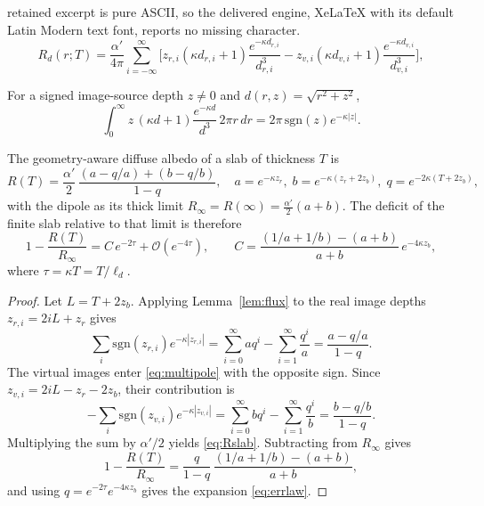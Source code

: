 \documentclass[10pt,a4paper]{amsart}
\newcommand{\ld}{\ell_d}
\begin{document}
retained excerpt is pure ASCII, so the delivered engine, XeLaTeX with its default Latin Modern text font, reports no missing character.
\begin{equation}
  R_d(r;T)=\frac{\alpha'}{4\pi}\sum_{i=-\infty}^{\infty}\!\Big[
  z_{r,i}(\kappa d_{r,i}{+}1)\frac{e^{-\kappa d_{r,i}}}{d_{r,i}^3}
  - z_{v,i}(\kappa d_{v,i}{+}1)\frac{e^{-\kappa d_{v,i}}}{d_{v,i}^3}\Big],
  \label{eq:multipole}
\end{equation}

\begin{lemma}
\label{lem:flux}
For a signed image-source depth $z\ne0$ and $d(r,z)=\sqrt{r^2+z^2}$,
\begin{equation}
\int_0^\infty z\,(\kappa d+1)\frac{e^{-\kappa d}}{d^3}\,2\pi r\,dr
=2\pi\,\mathrm{sgn}(z)e^{-\kappa |z|}.
\label{eq:fluxidentity}
\end{equation}
\end{lemma}

\begin{proposition}
\label{prop:law}
The geometry-aware diffuse albedo of a slab of thickness $T$ is
\begin{equation}
R(T)=\frac{\alpha'}{2}\,
\frac{(a-q/a)+(b-q/b)}{1-q},\quad
a=e^{-\kappa z_r},\; b=e^{-\kappa(z_r+2z_b)},\; q=e^{-2\kappa(T+2z_b)},
\label{eq:Rslab}
\end{equation}
with the dipole as its thick limit $R_\infty=R(\infty)=\tfrac{\alpha'}{2}(a+b)$. The
deficit of the finite slab relative to that limit is therefore
\begin{equation}
1-\frac{R(T)}{R_\infty}=C\,e^{-2\tau}+\mathcal{O}(e^{-4\tau}),\qquad
C=\frac{(1/a+1/b)-(a+b)}{a+b}\,e^{-4\kappa z_b},
\label{eq:errlaw}
\end{equation}
where $\tau=\kappa T=T/\ld$.
\end{proposition}

\begin{proof}
Let $L=T+2z_b$. Applying Lemma~\ref{lem:flux} to the real image depths
$z_{r,i}=2iL+z_r$ gives
\[
\sum_i \mathrm{sgn}(z_{r,i})e^{-\kappa |z_{r,i}|}
=\sum_{i=0}^{\infty}a q^i-\sum_{i=1}^{\infty}\frac{q^i}{a}
=\frac{a-q/a}{1-q}.
\]
The virtual images enter \eqref{eq:multipole} with the opposite sign. Since
$z_{v,i}=2iL-z_r-2z_b$, their contribution is
\[
-\sum_i \mathrm{sgn}(z_{v,i})e^{-\kappa |z_{v,i}|}
=\sum_{i=0}^{\infty}b q^i-\sum_{i=1}^{\infty}\frac{q^i}{b}
=\frac{b-q/b}{1-q}.
\]
Multiplying the sum by $\alpha'/2$ yields \eqref{eq:Rslab}. Subtracting from
$R_\infty$ gives
\[
1-\frac{R(T)}{R_\infty}
=\frac{q}{1-q}\,
\frac{(1/a+1/b)-(a+b)}{a+b},
\]
and using $q=e^{-2\tau}e^{-4\kappa z_b}$ gives the expansion
\eqref{eq:errlaw}.
\end{proof}
\end{document}
